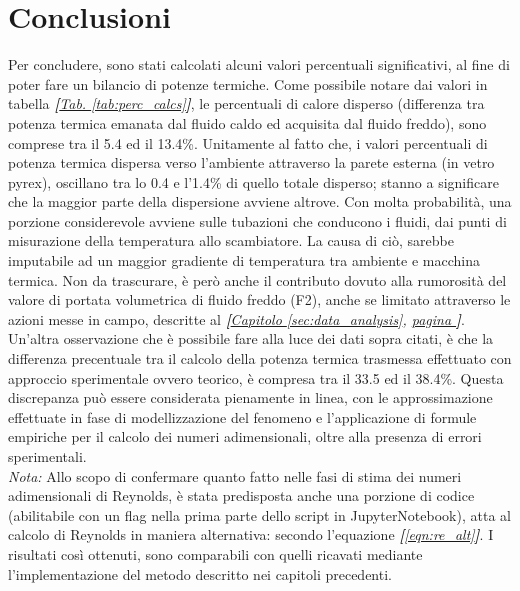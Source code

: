\documentclass[a4paper,10pt]{article}                                                                                       %
\begin{document}
\section{Conclusioni}                                                                                                       %
\label{sec:conclusions}                                                                                                     %
  Per concludere, sono stati calcolati alcuni valori percentuali significativi, al fine di poter fare un bilancio di
  potenze termiche. Come possibile notare dai valori in tabella
  \textit{\textbf{[}\hyperref[tab:perc_calcs]{Tab. }\ref{tab:perc_calcs}\textbf{]}}, le percentuali di calore disperso
  (differenza tra potenza termica emanata dal fluido caldo ed acquisita dal fluido freddo), sono comprese tra il 5.4 ed il
  13.4\%. Unitamente al fatto che, i valori percentuali di potenza termica dispersa verso l'ambiente attraverso la parete
  esterna (in vetro pyrex), oscillano tra lo 0.4 e l'1.4\% di quello totale disperso; stanno a significare che la maggior
  parte della dispersione avviene altrove. Con molta probabilità, una porzione considerevole avviene sulle tubazioni che
  conducono i fluidi, dai punti di misurazione della temperatura allo scambiatore. La causa di ciò, sarebbe imputabile ad
  un maggior gradiente di temperatura tra ambiente e macchina termica. Non da trascurare, è però anche il contributo dovuto
  alla rumorosità del valore di portata volumetrica di fluido freddo (F2), anche se limitato attraverso le azioni messe in
  campo, descritte al \textit{\textbf{[}\hyperref[sec:data_analysis]{Capitolo }\ref{sec:data_analysis},
  \hyperref[sec:data_analysis]{pagina }\pageref{sec:data_analysis}\textbf{]}}. Un'altra osservazione che è possibile fare
  alla luce dei dati sopra citati, è che la differenza precentuale tra il calcolo della potenza termica trasmessa
  effettuato con approccio sperimentale ovvero teorico, è compresa tra il 33.5 ed il 38.4\%. Questa discrepanza può essere
  considerata pienamente in linea, con le approssimazione effettuate in fase di modellizzazione del fenomeno e
  l'applicazione di formule empiriche per il calcolo dei numeri adimensionali, oltre alla presenza di errori
  sperimentali.\vspace{2mm}\\
  \textit{Nota:} Allo scopo di confermare quanto fatto nelle fasi di stima dei numeri adimensionali di Reynolds, è stata
  predisposta anche una porzione di codice (abilitabile con un flag nella prima parte dello script in JupyterNotebook),
  atta al calcolo di Reynolds in maniera alternativa: secondo l'equazione \textit{\textbf{[}\ref{eqn:re_alt}\textbf{]}}.
  I risultati così ottenuti, sono comparabili con quelli ricavati mediante l'implementazione del metodo descritto nei
  capitoli precedenti.
\clearpage                                                                                                                  %
\end{document}

